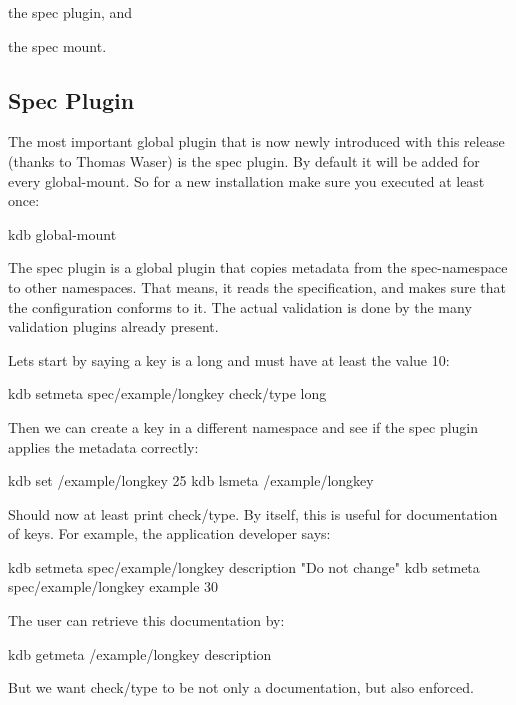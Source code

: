 \begin{DoxyEnumerate}
\item the spec plugin, and
\item the spec mount.
\end{DoxyEnumerate}

\subsection*{Spec Plugin}

The most important global plugin that is now newly introduced with this release (thanks to Thomas Waser) is the {\ttfamily spec} plugin. By default it will be added for every global-\/mount. So for a new installation make sure you executed at least once\+: \begin{DoxyVerb}    kdb global-mount
\end{DoxyVerb}


The spec plugin is a global plugin that copies metadata from the {\ttfamily spec}-\/namespace to other namespaces. That means, it reads the specification, and makes sure that the configuration conforms to it. The actual validation is done by the many validation plugins already present.

Lets start by saying a key is a long and must have at least the value 10\+: \begin{DoxyVerb}    kdb setmeta spec/example/longkey check/type long
\end{DoxyVerb}


Then we can create a key in a different namespace and see if the {\ttfamily spec} plugin applies the metadata correctly\+: \begin{DoxyVerb}    kdb set /example/longkey 25
    kdb lsmeta /example/longkey
\end{DoxyVerb}


Should now at least print {\ttfamily check/type}. By itself, this is useful for documentation of keys. For example, the application developer says\+: \begin{DoxyVerb}    kdb setmeta spec/example/longkey description "Do not change"
    kdb setmeta spec/example/longkey example 30
\end{DoxyVerb}


The user can retrieve this documentation by\+: \begin{DoxyVerb}    kdb getmeta /example/longkey description
\end{DoxyVerb}


But we want {\ttfamily check/type} to be not only a documentation, but also enforced.

